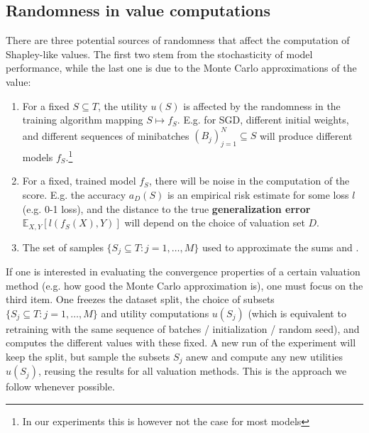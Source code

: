 \documentclass[10pt]{article}
\newcommand{\tmdfn}[1]{\textbf{#1}}
\begin{document}
\subsection{Randomness in value computations}\label{sec:sources-of-randomness}

There are three potential sources of randomness that affect the computation of
Shapley-like values. The first two stem from the stochasticity of model
performance, while the last one is due to the Monte Carlo approximations of
the value:
\begin{enumerate}
  \item For a fixed $S \subseteq T$, the utility $u (S)$ is affected by the
  randomness in the training algorithm mapping $S \mapsto f_S$. E.g. for SGD,
  different initial weights, and different sequences of minibatches $(B_j)_{j
  = 1}^N \subseteq S$ will produce different models $f_S$.\footnote{In our
  experiments this is however not the case for most models}

  \item For a fixed, trained model $f_S $, there will be noise in the
  computation of the score. E.g. the accuracy $a_D (S)$ is an empirical risk
  estimate for some loss $l$ (e.g. 0-1 loss), and the distance to the true
  {\tmdfn{generalization error}} $\mathbb{E}_{X, Y} [l (f_S (X), Y)]$ will
  depend on the choice of valuation set $D$.

  \item The set of samples $\{ S_j \subseteq T : j = 1, \ldots, M \}$ used to
  approximate the sums  and .
\end{enumerate}
If one is interested in evaluating the convergence properties of a certain
valuation method (e.g. how good the Monte Carlo approximation is), one must
focus on the third item. One freezes the dataset split, the choice of subsets
$\{ S_j \subseteq T : j = 1, \ldots, M \}$ and utility computations $u (S_j)$
(which is equivalent to retraining with the same sequence of batches /
initialization / random seed), and computes the different values with these
fixed. A new run of the experiment will keep the split, but sample the subsets
$S_j$ anew and compute any new utilities $u (S_j)$, reusing the results for
all valuation methods. This is the approach we follow whenever possible.
\end{document}
